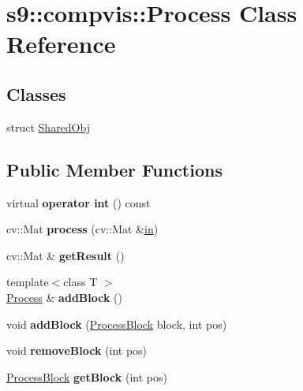 \hypertarget{classs9_1_1compvis_1_1Process}{\section{s9\-:\-:compvis\-:\-:Process Class Reference}
\label{classs9_1_1compvis_1_1Process}
}
\subsection*{Classes}
\begin{DoxyCompactItemize}
\item 
struct \hyperlink{structs9_1_1compvis_1_1Process_1_1SharedObj}{Shared\-Obj}
\end{DoxyCompactItemize}
\subsection*{Public Member Functions}
\begin{DoxyCompactItemize}
\item 
\hypertarget{classs9_1_1compvis_1_1Process_a95bedc8cef212cd12c5d4dfbf68026b8}{virtual {\bfseries operator int} () const }\label{classs9_1_1compvis_1_1Process_a95bedc8cef212cd12c5d4dfbf68026b8}

\item 
\hypertarget{classs9_1_1compvis_1_1Process_a96f6cf110357fa65d344079744598a9e}{cv\-::\-Mat {\bfseries process} (cv\-::\-Mat \&\hyperlink{structin}{in})}\label{classs9_1_1compvis_1_1Process_a96f6cf110357fa65d344079744598a9e}

\item 
\hypertarget{classs9_1_1compvis_1_1Process_a79625b1be630b1447390cd62e07cfe62}{cv\-::\-Mat \& {\bfseries get\-Result} ()}\label{classs9_1_1compvis_1_1Process_a79625b1be630b1447390cd62e07cfe62}

\item 
\hypertarget{classs9_1_1compvis_1_1Process_ab729de1f8ea74ec662692d9e9e369e03}{{\footnotesize template$<$class T $>$ }\\\hyperlink{classs9_1_1compvis_1_1Process}{Process} \& {\bfseries add\-Block} ()}\label{classs9_1_1compvis_1_1Process_ab729de1f8ea74ec662692d9e9e369e03}

\item 
\hypertarget{classs9_1_1compvis_1_1Process_a238d5278ffd8749ea31621edc14593ae}{void {\bfseries add\-Block} (\hyperlink{classs9_1_1compvis_1_1ProcessBlock}{Process\-Block} block, int pos)}\label{classs9_1_1compvis_1_1Process_a238d5278ffd8749ea31621edc14593ae}

\item 
\hypertarget{classs9_1_1compvis_1_1Process_a2c8222a1f0005a540abe4fa841fa97ed}{void {\bfseries remove\-Block} (int pos)}\label{classs9_1_1compvis_1_1Process_a2c8222a1f0005a540abe4fa841fa97ed}

\item 
\hypertarget{classs9_1_1compvis_1_1Process_a9df4c25c176e8f77e5af15ab6c6e7c6b}{\hyperlink{classs9_1_1compvis_1_1ProcessBlock}{Process\-Block} {\bfseries get\-Block} (int pos)}\label{classs9_1_1compvis_1_1Process_a9df4c25c176e8f77e5af15ab6c6e7c6b}

\end{DoxyCompactItemize}
